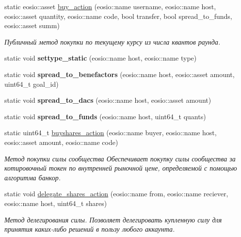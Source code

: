 \begin{DoxyCompactItemize}
static eosio\+::asset \mbox{\hyperlink{classunicore_ad50a4ce9c9910d11c914c01ba15f859c}{buy\+\_\+action}} (eosio\+::name username, eosio\+::name host, eosio\+::asset quantity, eosio\+::name code, bool transfer, bool spread\+\_\+to\+\_\+funds, eosio\+::asset summ)
\begin{DoxyCompactList}\small\item\em Публичный метод покупки по текущему курсу из числа квантов раунда. \end{DoxyCompactList}\item 
\mbox{\label{classunicore_ada4e4997f2a64086d89dd64c26b13cb4}} 
static void {\bfseries settype\+\_\+static} (eosio\+::name host, eosio\+::name type)
\item 
\mbox{\label{classunicore_a26f7df861487d0d3b018376b9b3fea9d}} 
static void {\bfseries spread\+\_\+to\+\_\+benefactors} (eosio\+::name host, eosio\+::asset amount, uint64\+\_\+t goal\+\_\+id)
\item 
\mbox{\label{classunicore_a97e2f30594f2b3dab8302e1c086b5a5d}} 
static void {\bfseries spread\+\_\+to\+\_\+dacs} (eosio\+::name host, eosio\+::asset amount)
\item 
\mbox{\label{classunicore_ab0a98a60f69f5c664ae2276f4cdf4e83}} 
static void {\bfseries spread\+\_\+to\+\_\+funds} (eosio\+::name host, uint64\+\_\+t quants)
\item 
static uint64\+\_\+t \mbox{\hyperlink{classunicore_adcb2695fb82248b1037eba240d567fdc}{buyshares\+\_\+action}} (eosio\+::name buyer, eosio\+::name host, eosio\+::asset amount, eosio\+::name code)
\begin{DoxyCompactList}\small\item\em Метод покупки силы сообщества Обеспечивает покупку силы сообщества за котировочный токен по внутренней рыночной цене, определяемой с помощью алгоритма банкор. \end{DoxyCompactList}\item 
static void \mbox{\hyperlink{classunicore_ad357c4583f4d72f085919ad874bf0b28}{delegate\+\_\+shares\+\_\+action}} (eosio\+::name from, eosio\+::name reciever, eosio\+::name host, uint64\+\_\+t shares)
\begin{DoxyCompactList}\small\item\em Метод делегирования силы. Позволяет делегировать купленную силу для принятия каких-\/либо решений в пользу любого аккаунта. \end{DoxyCompactList}\item 

\end{DoxyCompactItemize}
